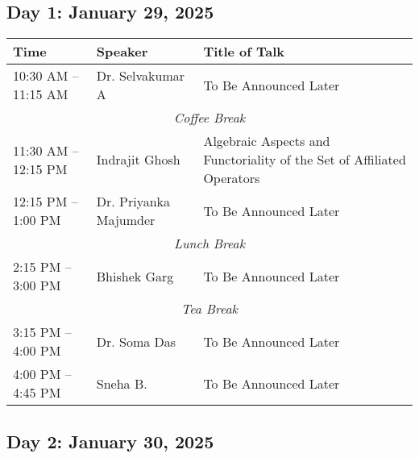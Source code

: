 %
%
\subsection*{Day 1: January 29, 2025}

\noindent
\renewcommand{\arraystretch}{1.5} %
\begin{tabular}{|p{3.5cm}|p{4cm}|p{7cm}|}
	\hline
	\textbf{Time} & \textbf{Speaker} & \textbf{Title of Talk} \\
	\hline
	10:30 AM -- 11:15 AM & Dr. Selvakumar A & To Be Announced Later \\
	\hline
	\multicolumn{3}{|c|}{\textit{Coffee Break}} \\
	\hline
    11:30 AM -- 12:15 PM & Indrajit Ghosh & Algebraic Aspects and Functoriality of the Set of Affiliated Operators \\
	\hline
	12:15 PM -- 1:00 PM & Dr. Priyanka Majumder & To Be Announced Later \\
	\hline
	\multicolumn{3}{|c|}{\textit{Lunch Break}} \\
	\hline
	2:15 PM -- 3:00 PM & Bhishek Garg & To Be Announced Later \\
	\hline
	\multicolumn{3}{|c|}{\textit{Tea Break}} \\
	\hline
	3:15 PM -- 4:00 PM & Dr. Soma Das & To Be Announced Later \\
	\hline
	4:00 PM -- 4:45 PM & Sneha B. & To Be Announced Later \\
	\hline

\end{tabular}


\subsection*{Day 2: January 30, 2025}


